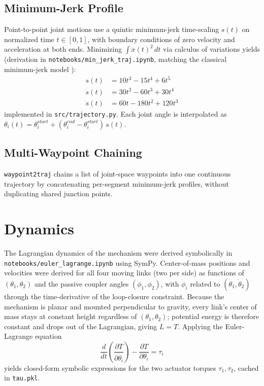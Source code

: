 \documentclass[11pt]{article}
\begin{document}
\subsection{Minimum-Jerk Profile}

Point-to-point joint motions use a quintic minimum-jerk time-scaling $s(t)$ on normalized time $t \in [0,1]$, with boundary conditions of zero velocity and acceleration at both ends. Minimizing $\int \dddot{x}(t)^2\,dt$ via calculus of variations yields (derivation in \texttt{notebooks/min\_jerk\_traj.ipynb}, matching the classical minimum-jerk model \cite{flash1985coordination}):
\begin{align}
s(t) &= 10t^3 - 15t^4 + 6t^5 \\
\dot{s}(t) &= 30t^2 - 60t^3 + 30t^4 \\
\ddot{s}(t) &= 60t - 180t^2 + 120t^3
\end{align}
implemented in \texttt{src/trajectory.py}. Each joint angle is interpolated as $\theta_i(t) = \theta_i^{start} + (\theta_i^{end}-\theta_i^{start})\,s(t)$.

\subsection{Multi-Waypoint Chaining}

\texttt{waypoint2traj} chains a list of joint-space waypoints into one continuous trajectory by concatenating per-segment minimum-jerk profiles, without duplicating shared junction points.


\section{Dynamics}

The Lagrangian dynamics of the mechanism were derived symbolically in \texttt{notebooks/euler\_lagrange.ipynb} using SymPy. Center-of-mass positions and velocities were derived for all four moving links (two per side) as functions of $(\theta_1,\theta_2)$ and the passive coupler angles $(\phi_1,\phi_2)$, with $\dot\phi_i$ related to $(\dot\theta_1,\dot\theta_2)$ through the time-derivative of the loop-closure constraint. Because the mechanism is planar and mounted perpendicular to gravity, every link's center of mass stays at constant height regardless of $(\theta_1,\theta_2)$; potential energy is therefore constant and drops out of the Lagrangian, giving $L = T$. Applying the Euler-Lagrange equation
\[
\frac{d}{dt}\left(\frac{\partial T}{\partial \dot\theta_i}\right) - \frac{\partial T}{\partial \theta_i} = \tau_i
\]
yields closed-form symbolic expressions for the two actuator torques $\tau_1, \tau_2$, cached in \texttt{tau.pkl}.
\end{document}
